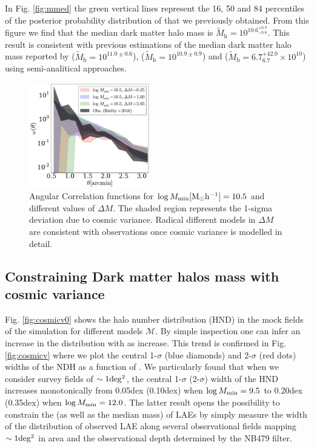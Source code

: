 \documentclass{emulateapj}
\newcommand{\mmin}{{\ifmmode{{M_{\rm min}}}\else{${M_{\rm min}}$}\fi}}
\newcommand{\lmmin}{{\ifmmode{{\log M_{\rm min}}}\else{${\log M_{\rm min}}$}\fi}}
\begin{document}
 In Fig. \ref{fig:mmed} the green vertical lines represent  the 16, 50
 and 84 percentiles  of the posterior probability distribution of
 \mmin that we previously obtained. From this figure we find that the
 median dark matter halo mass is $\tilde{M}_{\mathrm h} =
 10^{10.6^{+0.7}_{-0.6}} $. 
This result is consistent with previous
 estimations of  the  median dark matter halo mass reported by
 \citet{Bielby16} ($\tilde{M}_{\mathrm h} = 10^{11.0\pm0.6}$),
 \citet{Gawiser07} ($\tilde{M}_{\mathrm h} = 10^{10.9\pm0.9}$) and
 \citet{Ouchi2010} ($\tilde{M}_{\mathrm h} =
 6.7^{+42.0}_{6.7}\times10^{10}$) using semi-analitical approaches.   


\begin{figure}

  \includegraphics[width=0.47\textwidth]{fig5.pdf}
\caption{ Angular Correlation functions for $\log M_{\rm
    min}[\rm{M_{\odot}h^{-1}}]=10.5$ and different values of $\Delta
  M$.  
  The shaded region represents the 1-sigma deviation due to cosmic
  variance. Radical different models in $\Delta M$ are consistent with
  observations once cosmic variance is modelled in detail.}
\label{fig:corr}
\end{figure}



\subsection{Constraining Dark matter halos mass  with cosmic variance}
Fig. \ref{fig:cosmicv0}  shows the  halo number distribution (HND) in the  mock fields of the simulation for different models $\mathcal{M}$. By simple inspection one can infer an increase in the distribution with as \lmmin increase.  This trend is confirmed in Fig. \ref{fig:cosmicv}  where we plot the central 1-$\sigma$ (blue diamonds) and 2-$\sigma$  (red dots) widths  of the NDH as a function of \lmmin. We particularly found that when we consider survey fields of $\sim1{\rm deg^2}$, the central  1-$\sigma$ (2-$\sigma$) width of the HND increases monotonically from 0.05dex (0.10dex) when $\lmmin=9.5$ to 0.20dex (0.35dex) when $\lmmin=12.0$. The latter result opens the possibility to constrain the \lmmin (as well as the median mass) of LAEs by simply measure the width of the distribution of observed LAE along several observational fields mapping $\sim1{\rm deg^2}$ in area and the observational depth determined by the NB479 filter.
\end{document}
